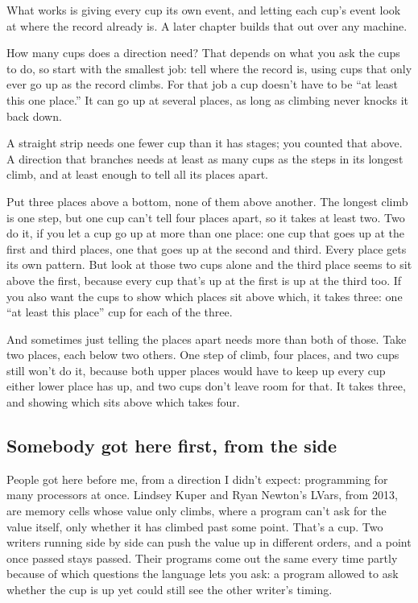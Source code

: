 \documentclass[11pt,twoside]{article}
\theoremstyle{thielethm}
\theoremstyle{thieledef}
\theoremstyle{thieledef}
\theoremstyle{thieledef}
\theoremstyle{thielethm}
\theoremstyle{thieleobs}
\theoremstyle{thielethm}
\begin{document}
What works is giving every cup its own event, and letting each cup's event look at where the record already is. A later chapter builds that out over any machine.

How many cups does a direction need? That depends on what you ask the cups to do, so start with the smallest job: tell where the record is, using cups that only ever go up as the record climbs. For that job a cup doesn't have to be ``at least this one place.'' It can go up at several places, as long as climbing never knocks it back down.

A straight strip needs one fewer cup than it has stages; you counted that above. A direction that branches needs at least as many cups as the steps in its longest climb, and at least enough to tell all its places apart.

Put three places above a bottom, none of them above another. The longest climb is one step, but one cup can't tell four places apart, so it takes at least two. Two do it, if you let a cup go up at more than one place: one cup that goes up at the first and third places, one that goes up at the second and third. Every place gets its own pattern. But look at those two cups alone and the third place seems to sit above the first, because every cup that's up at the first is up at the third too. If you also want the cups to show which places sit above which, it takes three: one ``at least this place'' cup for each of the three.

And sometimes just telling the places apart needs more than both of those. Take two places, each below two others. One step of climb, four places, and two cups still won't do it, because both upper places would have to keep up every cup either lower place has up, and two cups don't leave room for that. It takes three, and showing which sits above which takes four.

\subsection{Somebody got here first, from the side}

People got here before me, from a direction I didn't expect: programming for many processors at once. Lindsey Kuper and Ryan Newton's LVars, from 2013, are memory cells whose value only climbs, where a program can't ask for the value itself, only whether it has climbed past some point. That's a cup. Two writers running side by side can push the value up in different orders, and a point once passed stays passed. Their programs come out the same every time partly because of which questions the language lets you ask: a program allowed to ask whether the cup is up yet could still see the other writer's timing.
\end{document}
